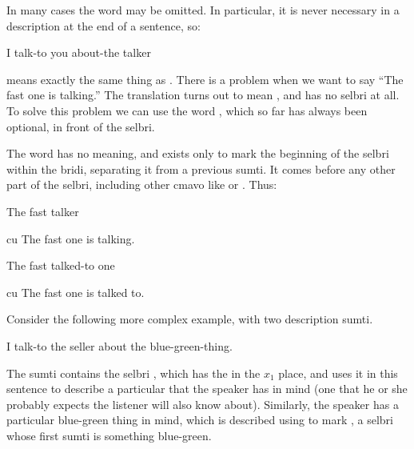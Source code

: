 In many cases the word  may be omitted. In particular, it is never necessary in a description at the end of a sentence, so:
\begin{example}
   \n
I talk-to you about-the talker
\end{example}

{\noindent}means exactly the same thing as . There is a problem when we want to say ``The fast one is talking.'' The  translation  turns out to mean , and has no selbri at all. To solve this problem we can use the word , which so far has always been optional, in front of the selbri.

The word  has no meaning, and exists only to mark the beginning of the selbri within the bridi, separating it from a previous sumti. It comes before any other part of the selbri, including other cmavo like  or . Thus:
\begin{example}
\n
The fast talker
\end{example}

\begin{example}
 cu \n
The fast one is talking.
\end{example}

\begin{example}
\n
The fast talked-to one
\end{example}

\begin{example}
 cu \n
The fast one is talked to.
\end{example}

Consider the following more complex example, with two description sumti.
\begin{example}
    \n
I       talk-to the seller    about the blue-green-thing.
\end{example}

The sumti  contains the selbri , which has the  in the $x_1$ place, and uses it in this sentence to describe a particular  that the speaker has in mind (one that he or she probably expects the listener will also know about). Similarly, the speaker has a particular blue-green thing in mind, which is described using  to mark , a selbri whose first sumti is something blue-green.


